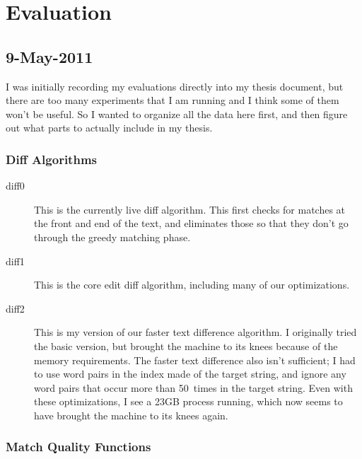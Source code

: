\section{Evaluation}

\subsection{9-May-2011}

I was initially recording my evaluations directly into my thesis
document, but there are too many experiments that I am running
and I think some of them won't be useful.
So I wanted to organize all the data here first, and then
figure out what parts to actually include in my thesis.

\subsubsection{Diff Algorithms}

\begin{description}
\item[diff0] This is the currently live diff algorithm.
	This first checks for matches at the front and end of
	the text, and eliminates those so that they don't go
	through the greedy matching phase.
\item[diff1] This is the core edit diff algorithm, including
	many of our optimizations.
\item[diff2] This is my version of our faster text difference algorithm.
    I originally tried the basic version, but brought the machine to
    its knees because of the memory requirements.
    The faster text difference also isn't sufficient; I had to
    use word pairs in the index made of the target string,
    and ignore any word pairs that occur more than 50~times
    in the target string.  Even with these optimizations, I
    see a 23GB process running, which now seems to have brought
    the machine to its knees again.
\end{description}

\subsubsection{Match Quality Functions}

